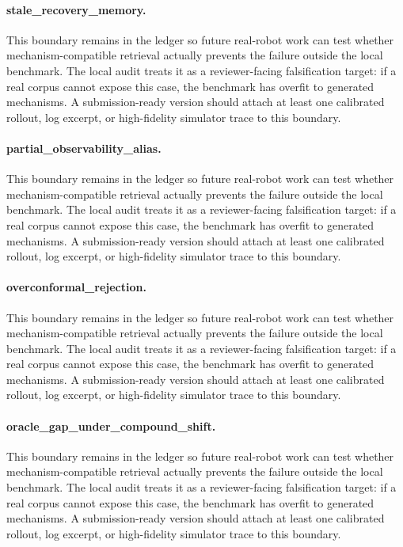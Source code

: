 \documentclass{article}
\begin{document}
\paragraph{stale\_recovery\_memory.} This boundary remains in the ledger so future real-robot work can test whether mechanism-compatible retrieval actually prevents the failure outside the local benchmark. The local audit treats it as a reviewer-facing falsification target: if a real corpus cannot expose this case, the benchmark has overfit to generated mechanisms. A submission-ready version should attach at least one calibrated rollout, log excerpt, or high-fidelity simulator trace to this boundary.
\paragraph{partial\_observability\_alias.} This boundary remains in the ledger so future real-robot work can test whether mechanism-compatible retrieval actually prevents the failure outside the local benchmark. The local audit treats it as a reviewer-facing falsification target: if a real corpus cannot expose this case, the benchmark has overfit to generated mechanisms. A submission-ready version should attach at least one calibrated rollout, log excerpt, or high-fidelity simulator trace to this boundary.
\paragraph{overconformal\_rejection.} This boundary remains in the ledger so future real-robot work can test whether mechanism-compatible retrieval actually prevents the failure outside the local benchmark. The local audit treats it as a reviewer-facing falsification target: if a real corpus cannot expose this case, the benchmark has overfit to generated mechanisms. A submission-ready version should attach at least one calibrated rollout, log excerpt, or high-fidelity simulator trace to this boundary.
\paragraph{oracle\_gap\_under\_compound\_shift.} This boundary remains in the ledger so future real-robot work can test whether mechanism-compatible retrieval actually prevents the failure outside the local benchmark. The local audit treats it as a reviewer-facing falsification target: if a real corpus cannot expose this case, the benchmark has overfit to generated mechanisms. A submission-ready version should attach at least one calibrated rollout, log excerpt, or high-fidelity simulator trace to this boundary.
\end{document}
